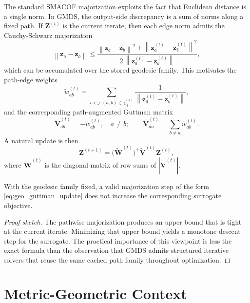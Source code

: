 \documentclass[twoside,11pt]{article}
\newcommand{\bz}{\mathbf{z}}
\newcommand{\bZ}{\mathbf{Z}}
\newcommand{\bV}{\mathbf{V}}
\newcommand{\bW}{\mathbf{W}}
\newcommand{\norm}[1]{\left\|#1\right\|}
\begin{document}
The standard SMACOF majorization exploits the fact that Euclidean distance is a
single norm.  In GMDS, the output-side discrepancy is a sum of norms along a
fixed path.  If $\bZ^{(t)}$ is the current iterate, then each edge norm admits
the Cauchy-Schwarz majorization
\begin{equation}
  \norm{\bz_a - \bz_b}
  \leq
  \frac{\norm{\bz_a - \bz_b}^2 + \norm{\bz^{(t)}_a - \bz^{(t)}_b}^2}
       {2\,\norm{\bz^{(t)}_a - \bz^{(t)}_b}},
  \label{eq:cs_majorization}
\end{equation}
which can be accumulated over the stored geodesic family.  This motivates the
path-edge weights
\begin{equation}
  \tilde{w}_{ab}^{(t)}
  = \sum_{i < j : (a,b) \in \gamma_{ij}^{(k)}}
    \frac{1}{\norm{\bz^{(t)}_a - \bz^{(t)}_b}},
  \label{eq:path_edge_weight}
\end{equation}
and the corresponding path-augmented Guttman matrix
\begin{equation}
  \tilde{\bV}^{(t)}_{ab}
  = -\tilde{w}^{(t)}_{ab}, \quad a \neq b; \qquad
  \tilde{\bV}^{(t)}_{aa}
  = \sum_{b \neq a} \tilde{w}^{(t)}_{ab}.
  \label{eq:augmented_guttman}
\end{equation}
A natural update is then
\begin{equation}
  \bZ^{(t+1)} = \bigl(\tilde{\bW}^{(t)}\bigr)^+ \tilde{\bV}^{(t)} \bZ^{(t)},
  \label{eq:geo_guttman_update}
\end{equation}
where $\tilde{\bW}^{(t)}$ is the diagonal matrix of row sums of
$|\tilde{\bV}^{(t)}|$.

\begin{proposition}
  \label{prop:monotone}
  With the geodesic family fixed, a valid majorization step of the form
  \eqref{eq:geo_guttman_update} does not increase the corresponding surrogate
  objective.
\end{proposition}

\begin{proof}[Proof sketch]
  The pathwise majorization produces an upper bound that is tight at the current
  iterate.  Minimizing that upper bound yields a monotone descent step for the
  surrogate.  The practical importance of this viewpoint is less the exact
  formula than the observation that GMDS admits structured iterative solvers
  that reuse the same cached path family throughout optimization.
\end{proof}

\section{Metric-Geometric Context}
\label{sec:metric_geometry_v4}
\label{sec:metric_geometry}
\end{document}
